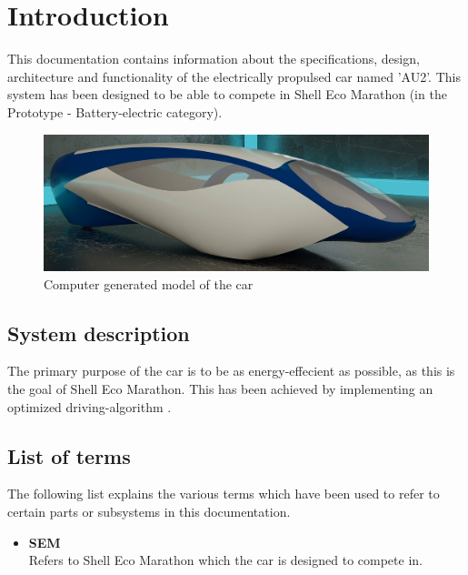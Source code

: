 \chapter{Introduction}
This documentation contains information about the specifications, design, architecture and functionality of the electrically propulsed car named 'AU2'. This system has been designed to be able to compete in Shell Eco Marathon (in the Prototype - Battery-electric category).

\begin{figure}[H]
	\centering
	\includegraphics[width=0.5\linewidth]{Introduction/Model}
	\caption{Computer generated model of the car}
	\label{fig:System_model}
\end{figure}

\section{System description}

The primary purpose of the car is to be as energy-effecient as possible, as this is the goal of Shell Eco Marathon. This has been achieved by implementing an optimized driving-algorithm .


\section{List of terms}
The following list explains the various terms which have been used to refer to certain parts or subsystems in this documentation.

\begin{itemize}
	\item \textbf{SEM}\\
	Refers to Shell Eco Marathon which the car is designed to compete in.
\end{itemize}